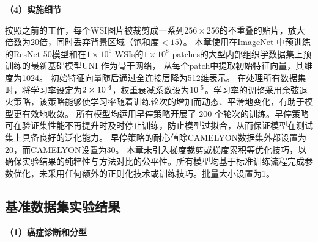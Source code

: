 \textbf{（4）实施细节}

按照之前的工作\cite{lu2021data,zhang2022dtfd,tang2023multiple}，每个WSI图片被裁剪成一系列$256 \times 256$的不重叠的贴片，放大倍数为20倍，同时丢弃背景区域（饱和度$< 15$）。
本章使用在ImageNet \cite{deng2009imagenet}中预训练的ResNet-50模型\cite{he2016deep}和在$1\times 10^6$ WSIs的$1\times 10^8$ patches的大型内部组织学数据集上预训练的最新基础模型UNI \cite{chen2024towards}作为骨干网络，
从每个patch中提取初始特征向量，其维度为1024。
初始特征向量随后通过全连接层降为512维表示。
在处理所有数据集时，将学习率设定为$2 \times 10^{\textnormal{-}4}$，权重衰减系数设为$10^{\textnormal{-}5}$。学习率的调整采用余弦退火策略，该策略能够使学习率随着训练轮次的增加而动态、平滑地变化，有助于模型更有效地收敛。
所有模型均运用早停策略开展了 200 个轮次的训练。早停策略可在验证集性能不再提升时及时停止训练，防止模型过拟合，从而保证模型在测试集上具备良好的泛化能力。
早停策略的耐心值除CAMELYON数据集外都设置为20，而CAMELYON设置为30。
本章未引入梯度裁剪或梯度累积等优化技巧，以确保实验结果的纯粹性与方法对比的公平性。所有模型均基于标准训练流程完成参数优化，未采用任何额外的正则化技术或训练技巧。批量大小设置为1。



\subsection[\hspace{-2pt}基准数据集实验结果]{{\heiti{} \hspace{-8pt}基准数据集实验结果}}\label{section3: 基准数据集实验结果}

\textbf{（1）癌症诊断和分型}


